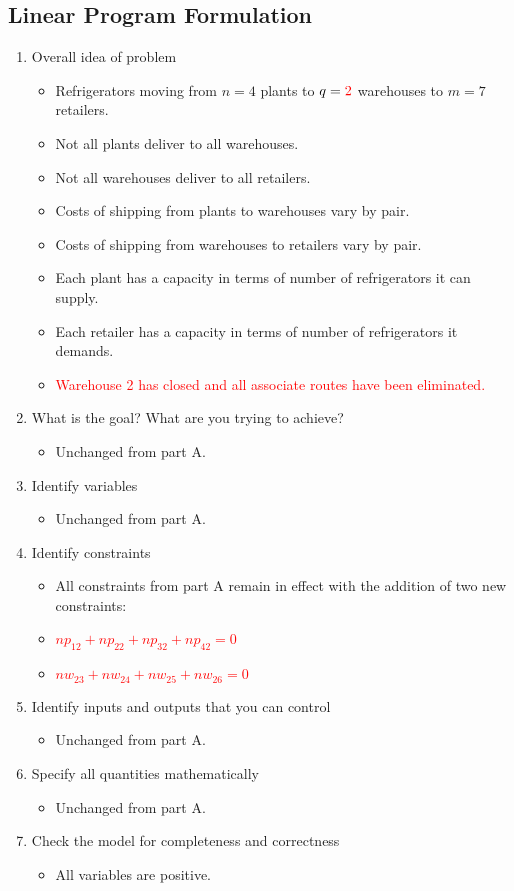\documentclass[../report/main.tex]{subfiles}
\begin{document}
\subsection*{Linear Program Formulation}
\begin{enumerate}[1.]
	\item Overall idea of problem
	\begin{itemize}
		\item Refrigerators moving from $n=4$ plants to $q=\textcolor{red}{2}$ warehouses to $m=7$ retailers.
		\item Not all plants deliver to all warehouses.
		\item Not all warehouses deliver to all retailers.
		\item Costs of shipping from plants to warehouses vary by pair.
		\item Costs of shipping from warehouses to retailers vary by pair.
		\item Each plant has a capacity in terms of number of refrigerators it can supply.
		\item Each retailer has a capacity in terms of number of refrigerators it demands.
		\item\textcolor{red}{Warehouse 2 has closed and all associate routes have been eliminated.}		
	\end{itemize}
	\item What is the goal?  What are you trying to achieve?
	\begin{itemize}
		\item Unchanged from part A.
	\end{itemize}
	\item Identify variables
	\begin{itemize}
		\item Unchanged from part A.
	\end{itemize}
	\item Identify constraints
	\begin{itemize}
		\item All constraints from part A remain in effect with the addition of two new constraints:
		\item\textcolor{red}{$np_{12} + np_{22} + np_{32} + np_{42} = 0$}		
		\item\textcolor{red}{$nw_{23} + nw_{24} + nw_{25} + nw_{26} = 0$}		
	\end{itemize}
	\item Identify inputs and outputs that you can control
	\begin{itemize}
		\item Unchanged from part A.
	\end{itemize}
	\item Specify all quantities mathematically
	\begin{itemize}
		\item Unchanged from part A.
	\end{itemize}
	\item Check the model for completeness and correctness
	\begin{itemize}
	\item All variables are positive.
	\end{itemize}
\end{enumerate}
\end{document}
